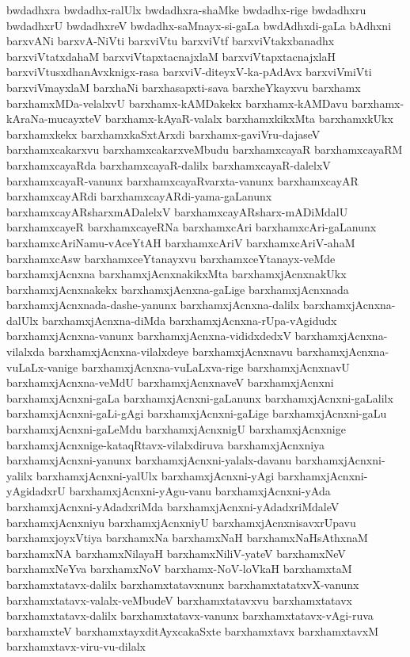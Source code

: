 {bwdadhxra
bwdadhx-ralUlx
bwdadhxra-shaMke
bwdadhx-rige
bwdadhxru
bwdadhxrU
bwdadhxreV
bwdadhx-saMnayx-si-gaLa
bwdAdhxdi-gaLa
bAdhxni
barxvANi
barxvA-NiVti
barxviVtu
barxviVtf
barxviVtakxbanadhx
barxviVtatxdahaM
barxviVtapxtacnajxlaM
barxviVtapxtacnajxlaH
barxviVtusxdhanAvxknigx-rasa
barxviV-diteyxV-ka-pAdAvx
barxviVmiVti
barxviVmayxlaM
barxhaNi
barxhasapxti-sava
barxheYkayxvu
barxhamx
barxhamxMDa-velalxvU
barxhamx-kAMDakekx
barxhamx-kAMDavu
barxhamx-kAraNa-mucayxteV
barxhamx-kAyaR-valalx
barxhamxkikxMta
barxhamxkUkx
barxhamxkekx
barxhamxkaSxtArxdi
barxhamx-gaviVru-dajaseV
barxhamxcakarxvu
barxhamxcakarxveMbudu
barxhamxcayaR
barxhamxcayaRM
barxhamxcayaRda
barxhamxcayaR-dalilx
barxhamxcayaR-dalelxV
barxhamxcayaR-vanunx
barxhamxcayaRvarxta-vanunx
barxhamxcayAR
barxhamxcayARdi
barxhamxcayARdi-yama-gaLanunx
barxhamxcayARsharxmADalelxV
barxhamxcayARsharx-mADiMdalU
barxhamxcayeR
barxhamxcayeRNa
barxhamxcAri
barxhamxcAri-gaLanunx
barxhamxcAriNamu-vAceYtAH
barxhamxcAriV
barxhamxcAriV-ahaM
barxhamxcAsw
barxhamxceYtanayxvu
barxhamxceYtanayx-veMde
barxhamxjAcnxna
barxhamxjAcnxnakikxMta
barxhamxjAcnxnakUkx
barxhamxjAcnxnakekx
barxhamxjAcnxna-gaLige
barxhamxjAcnxnada
barxhamxjAcnxnada-dashe-yanunx
barxhamxjAcnxna-dalilx
barxhamxjAcnxna-dalUlx
barxhamxjAcnxna-diMda
barxhamxjAcnxna-rUpa-vAgidudx
barxhamxjAcnxna-vanunx
barxhamxjAcnxna-vididxdedxV
barxhamxjAcnxna-vilalxda
barxhamxjAcnxna-vilalxdeye
barxhamxjAcnxnavu
barxhamxjAcnxna-vuLaLx-vanige
barxhamxjAcnxna-vuLaLxva-rige
barxhamxjAcnxnavU
barxhamxjAcnxna-veMdU
barxhamxjAcnxnaveV
barxhamxjAcnxni
barxhamxjAcnxni-gaLa
barxhamxjAcnxni-gaLanunx
barxhamxjAcnxni-gaLalilx
barxhamxjAcnxni-gaLi-gAgi
barxhamxjAcnxni-gaLige
barxhamxjAcnxni-gaLu
barxhamxjAcnxni-gaLeMdu
barxhamxjAcnxnigU
barxhamxjAcnxnige
barxhamxjAcnxnige-kataqRtavx-vilalxdiruva
barxhamxjAcnxniya
barxhamxjAcnxni-yanunx
barxhamxjAcnxni-yalalx-davanu
barxhamxjAcnxni-yalilx
barxhamxjAcnxni-yalUlx
barxhamxjAcnxni-yAgi
barxhamxjAcnxni-yAgidadxrU
barxhamxjAcnxni-yAgu-vanu
barxhamxjAcnxni-yAda
barxhamxjAcnxni-yAdadxriMda
barxhamxjAcnxni-yAdadxriMdaleV
barxhamxjAcnxniyu
barxhamxjAcnxniyU
barxhamxjAcnxnisavxrUpavu
barxhamxjoyxVtiya
barxhamxNa
barxhamxNaH
barxhamxNaHsAthxnaM
barxhamxNA
barxhamxNilayaH
barxhamxNiliV-yateV
barxhamxNeV
barxhamxNeYva
barxhamxNoV
barxhamx-NoV-loVkaH
barxhamxtaM
barxhamxtatavx-dalilx
barxhamxtatavxnunx
barxhamxtatatxvX-vanunx
barxhamxtatavx-valalx-veMbudeV
barxhamxtatavxvu
barxhamxtatavx
barxhamxtatavx-dalilx
barxhamxtatavx-vanunx
barxhamxtatavx-vAgi-ruva
barxhamxteV
barxhamxtayxditAyxcakaSxte
barxhamxtavx
barxhamxtavxM
barxhamxtavx-viru-vu-dilalx
}
